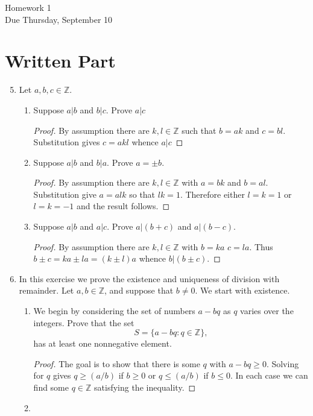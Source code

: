 \documentclass[11pt]{article}
\newcommand{\bZ}{\mathbb{Z}}
\begin{document}
\begin{center}
\Large {Homework 1}\\
\small {Due Thursday, September 10}
\end{center}
\section*{Written Part}
\begin{enumerate}
  \setcounter{enumi}{4}
  \item{
  Let $a,b,c\in\bZ$.
  \begin{enumerate}
    \item{
    Suppose $a|b$ and $b|c$.  Prove $a|c$
    }
    \begin{proof}
      By assumption there are $k,l\in\bZ$ such that $b = ak$ and $c = bl$.  Substitution gives $c = akl$ whence $a|c$
    \end{proof}
    \item{
    Suppose $a|b$ and $b|a$.  Prove $a=\pm b$.
    }
    \begin{proof}
      By assumption there are $k,l\in\bZ$ with $a = bk$ and $b = al$.  Substitution give $a = alk$ so that $lk = 1$.  Therefore either $l = k = 1$ or $l = k = -1$ and the result follows.
    \end{proof}
    \item{
    Suppose $a|b$ and $a|c$.  Prove $a|(b+c)$ and $a|(b-c)$.
    \begin{proof}
      By assumption there are $k,l\in\bZ$ with $b = ka$ $c = la$.  Thus $b\pm c = ka \pm la = (k\pm l)a$ whence $b|(b\pm c)$.
    \end{proof}
    }
  \end{enumerate}
  }
  \item{
  In this exercise we prove the existence and uniqueness of division with remainder.  Let $a,b\in\bZ$, and suppose that $b\not=0$.  We start with existence.
  \begin{enumerate}
    \item{
    We begin by considering the set of numbers $a-bq$ as $q$ varies over the integers.  Prove that the set
    \[S = \{a-bq : q\in\bZ\},\]
    has at least one nonnegative element.
    }
    \begin{proof}
      The goal is to show that there is some $q$ with $a-bq\ge0$.  Solving for $q$ gives $q\ge(a/b)$ if $b\ge0$ or $q\le(a/b)$ if $b\le0$.  In each case we can find some $q\in\bZ$ satisfying the inequality.
    \end{proof}
    \item{
}
\end{enumerate}}
\end{enumerate}
\end{document}
